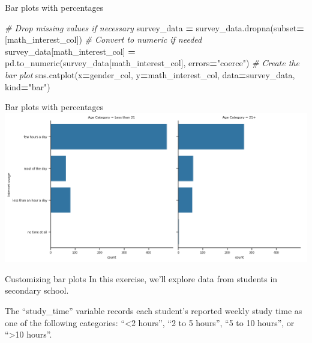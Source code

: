 \documentclass[
  ignorenonframetext,
]{beamer}
\newenvironment{Shaded}{\begin{snugshade}}{\end{snugshade}}
\newcommand{\CommentTok}[1]{\textcolor[rgb]{0.56,0.35,0.01}{\textit{#1}}}
\newcommand{\NormalTok}[1]{#1}
\newcommand{\OperatorTok}[1]{\textcolor[rgb]{0.81,0.36,0.00}{\textbf{#1}}}
\newcommand{\StringTok}[1]{\textcolor[rgb]{0.31,0.60,0.02}{#1}}
\begin{document}
\begin{frame}[fragile]{Bar plots with percentages}
\label{bar-plots-with-percentages-5}

\begin{Shaded}
\begin{Highlighting}[]
\CommentTok{\# Drop missing values if necessary}
\NormalTok{survey\_data }\OperatorTok{=}\NormalTok{ survey\_data.dropna(subset}\OperatorTok{=}\NormalTok{[math\_interest\_col])}
\CommentTok{\# Convert to numeric if needed}
\NormalTok{survey\_data[math\_interest\_col] }\OperatorTok{=}\NormalTok{ pd.to\_numeric(survey\_data[math\_interest\_col], errors}\OperatorTok{=}\StringTok{"coerce"}\NormalTok{)}
\CommentTok{\# Create the bar plot}
\NormalTok{sns.catplot(x}\OperatorTok{=}\NormalTok{gender\_col, y}\OperatorTok{=}\NormalTok{math\_interest\_col, data}\OperatorTok{=}\NormalTok{survey\_data, kind}\OperatorTok{=}\StringTok{"bar"}\NormalTok{)}
\end{Highlighting}
\end{Shaded}
\end{frame}

\begin{frame}{Bar plots with percentages}
\label{bar-plots-with-percentages-6}
\includegraphics{../images/im281.png}
\end{frame}

\begin{frame}{Customizing bar plots}
\label{customizing-bar-plots}
In this exercise, we'll explore data from students in secondary school.

The ``study\_time'' variable records each student's reported weekly
study time as one of the following categories: ``\textless2 hours'', ``2
to 5 hours'', ``5 to 10 hours'', or ``\textgreater10 hours''.
\end{frame}
\end{document}
